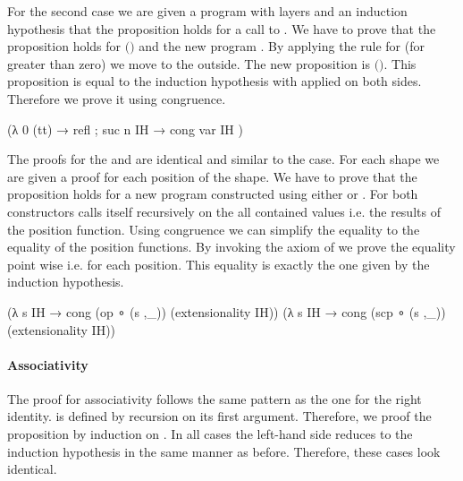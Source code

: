 \begin{AgdaAlign}
For the second case we are given a program  with
\AgdaSpace{} layers and an
induction hypothesis  that the proposition holds for a call to
\AgdaSpace{}.
We have to prove that the proposition holds for
\AgdaSpace{}$($\AgdaSpace{}$)$
and the new program \AgdaSpace{}.
By applying the \AgdaFunction{>>=} rule for  (for
 greater than zero) we move  to
the outside.
The new proposition is
\AgdaSpace{}$($\AgdaSpace{}$)$\AgdaSpace{}\AgdaSpace{}\AgdaSpace{}.
This proposition is equal to the induction hypothesis with
 applied on both sides.
Therefore we prove it using congruence.

\begin{code}
  (λ{ {0} (tt) → refl ; {suc n} IH → cong var IH })
\end{code}
The proofs for the  and
 are identical and similar to the
 case. For each shape  we are
given a proof for each position of the shape.
We have to prove that the proposition holds for a new program constructed using
either  or .
For both constructors \AgdaSpace{} calls
itself recursively on the all contained values i.e. the results of the position
function.
Using congruence we can simplify the equality to the equality of the position
functions.
By invoking the axiom of  we prove the equality
point wise i.e. for each position.
This equality is exactly the one given by the induction hypothesis.

\begin{code}
  (λ s IH → cong (op   ∘ (s ,_)) (extensionality IH))
  (λ s IH → cong (scp  ∘ (s ,_)) (extensionality IH))
\end{code}
\end{AgdaAlign}

\paragraph{Associativity}
The proof for associativity follows the same pattern as the one for the right
identity.
\AgdaFunction{>>=} is defined by recursion on its first argument.
Therefore, we proof the proposition by induction on .
In all cases the left-hand side reduces to the induction hypothesis in the same
manner as before.
Therefore, these cases look identical.

